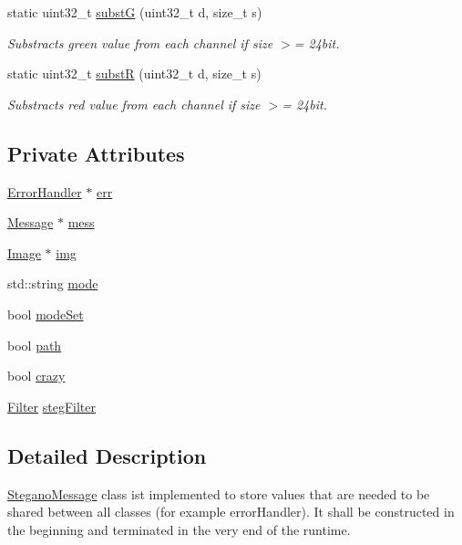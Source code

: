 \begin{DoxyCompactItemize}
static uint32\+\_\+t \mbox{\hyperlink{classSteganoMessage_a4222a1b128b9b188c30ea99180f74111}{substG}} (uint32\+\_\+t d, size\+\_\+t s)
\begin{DoxyCompactList}\small\item\em Substracts green value from each channel if size $>$= 24bit. \end{DoxyCompactList}\item 
static uint32\+\_\+t \mbox{\hyperlink{classSteganoMessage_a021f0126410e739bc89ac2458198ad0c}{substR}} (uint32\+\_\+t d, size\+\_\+t s)
\begin{DoxyCompactList}\small\item\em Substracts red value from each channel if size $>$= 24bit. \end{DoxyCompactList}\end{DoxyCompactItemize}
\subsection*{Private Attributes}
\begin{DoxyCompactItemize}
\item 
\mbox{\hyperlink{classErrorHandler}{Error\+Handler}} $\ast$ \mbox{\hyperlink{classSteganoMessage_a26b631e00716be7a89cbcf22cf0b7291}{err}}
\item 
\mbox{\hyperlink{classMessage}{Message}} $\ast$ \mbox{\hyperlink{classSteganoMessage_a64f70bbacb0662cebe764316658da35d}{mess}}
\item 
\mbox{\hyperlink{classImage}{Image}} $\ast$ \mbox{\hyperlink{classSteganoMessage_acd7dba217d5df515d93ddf814734ecf4}{img}}
\item 
std\+::string \mbox{\hyperlink{classSteganoMessage_a8772194b7823da730648f8d4c06334a8}{mode}}
\item 
bool \mbox{\hyperlink{classSteganoMessage_ae1da17c621a8db71fa4eb3b148a82ceb}{mode\+Set}}
\item 
bool \mbox{\hyperlink{classSteganoMessage_a399f4c181d3b7b15ccdb5c925a7a1f51}{path}}
\item 
bool \mbox{\hyperlink{classSteganoMessage_aa66c9e1d0367981d42ede819e1a51131}{crazy}}
\item 
\mbox{\hyperlink{constants_8h_adccf6e8a392b0d35f185df12521c474b}{Filter}} \mbox{\hyperlink{classSteganoMessage_ab0cca34d0f02f406733e62a477bb15be}{steg\+Filter}}
\end{DoxyCompactItemize}


\subsection{Detailed Description}
\mbox{\hyperlink{classSteganoMessage}{Stegano\+Message}} class ist implemented to store values that are needed to be shared between all classes (for example error\+Handler). It shall be constructed in the beginning and terminated in the very end of the runtime. 


